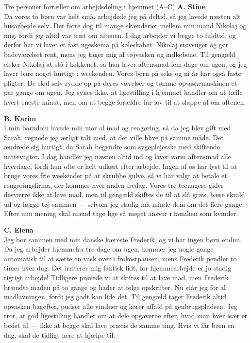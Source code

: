 \begin{emailbox}{Tre personer fortæller om arbejdsdeling i hjemmet (A--C)}
\textbf{\color{NCDNavy}A. Stine}\\
Da vores to børn var helt små, arbejdede jeg på deltid, så jeg lavede næsten alt husarbejde selv. Det førte dog til mange skænderier mellem min mand Nikolaj og mig, fordi jeg altid var træt om aftenen. I dag arbejder vi begge to fuldtid, og derfor har vi lavet et fast ugeskema på køleskabet. Nikolaj støvsuger og gør badeværelset rent, mens jeg tager mig af tøjvasken og indkøbene. Til gengæld elsker Nikolaj at stå i køkkenet, så han laver aftensmad fem dage om ugen, og jeg laver bare noget hurtigt i weekenden. Vores børn på seks og ni år har også faste pligter: De skal selv rydde op på deres værelser og tømme opvaskemaskinen et par gange om ugen. Jeg synes ikke, at ligestilling i hjemmet handler om at tælle hvert eneste minut, men om at begge forældre får lov til at slappe af om aftenen.

\vspace{0.45em}
\textbf{\color{NCDNavy}B. Karim}\\
I min barndom lavede min mor al mad og rengøring, så da jeg blev gift med Sarah, regnede jeg ærligt talt med, at det ville blive på samme måde. Det ændrede sig hurtigt, da Sarah begyndte som sygeplejerske med skiftende nattevagter. I dag handler jeg næsten altid ind og laver varm aftensmad alle hverdage, fordi hun ofte er helt udkørt efter arbejde. Ingen af os har lyst til at bruge vores frie weekender på at skrubbe gulve, så vi har valgt at betale et rengøringsfirma, der kommer hver anden fredag. Vores tre teenagere gider desværre ikke at lave mad, men til gengæld skiftes de til at slå græs, bære skrald ud og lægge tøj sammen --- selvom jeg stadig må minde dem om det flere gange. Efter min mening skal mænd tage lige så meget ansvar i familien som kvinder.

\vspace{0.45em}
\textbf{\color{NCDNavy}C. Elena}\\
Jeg bor sammen med min danske kæreste Frederik, og vi har ingen børn endnu. Da jeg arbejder hjemmefra tre dage om ugen, kommer jeg nogle gange automatisk til at sætte en vask over i frokostpausen, mens Frederik pendler to timer hver dag. Det irriterer mig faktisk lidt, for hjemmearbejde er jo stadig rigtigt arbejde! Tidligere prøvede vi at skiftes til at lave mad, men Frederik brændte maden på to gange og hader at følge opskrifter. Nu står jeg for al madlavningen, fordi jeg godt kan lide det. Til gengæld tager Frederik altid opvasken bagefter, pudser alle vinduer og kører affald på genbrugspladsen. Jeg tror, at god ligestilling handler om at dele opgaverne efter, hvad man hver især er bedst til --- ikke at begge skal lave præcis de samme ting. Hvis vi får børn en dag, skal de tidligt lære at hjælpe til.
\end{emailbox}

